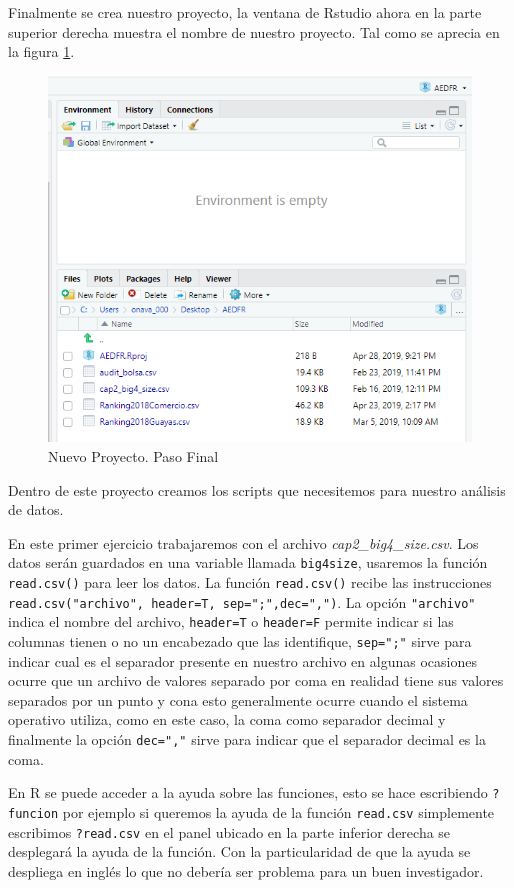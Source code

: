 \documentclass[
]{krantz}
\begin{document}
Finalmente se crea nuestro proyecto, la ventana de Rstudio ahora en la parte superior derecha muestra el nombre de nuestro proyecto. Tal como se aprecia en la figura \ref{fig:project4}.

\begin{figure}[!h]

{\centering \includegraphics[width=0.4\linewidth]{project4} 

}

\caption{Nuevo Proyecto. Paso Final}\label{fig:project4}
\end{figure}

Dentro de este proyecto creamos los scripts que necesitemos para nuestro análisis de datos.

En este primer ejercicio trabajaremos con el archivo \emph{cap2\_big4\_size.csv}. Los datos serán guardados en una variable llamada \texttt{big4size}, usaremos la función \texttt{read.csv()} para leer los datos. La función \texttt{read.csv()} recibe las instrucciones \texttt{read.csv("archivo",\ header=T,\ sep=";",dec=",")}. La opción \texttt{"archivo"} indica el nombre del archivo, \texttt{header=T} o \texttt{header=F} permite indicar si las columnas tienen o no un encabezado que las identifique, \texttt{sep=";"} sirve para indicar cual es el separador presente en nuestro archivo en algunas ocasiones ocurre que un archivo de valores separado por coma en realidad tiene sus valores separados por un punto y cona esto generalmente ocurre cuando el sistema operativo utiliza, como en este caso, la coma como separador decimal y finalmente la opción \texttt{dec=","} sirve para indicar que el separador decimal es la coma.

En R se puede acceder a la ayuda sobre las funciones, esto se hace escribiendo \texttt{?funcion} por ejemplo si queremos la ayuda de la función \texttt{read.csv} simplemente escribimos \texttt{?read.csv} en el panel ubicado en la parte inferior derecha se desplegará la ayuda de la función. Con la particularidad de que la ayuda se despliega en inglés lo que no debería ser problema para un buen investigador.
\end{document}

